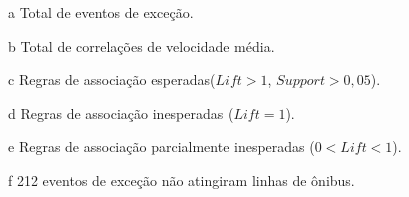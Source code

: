 \documentclass[
	12pt,				%
	oneside,			%
	a4paper,			%
	english,			%
	brazil				%
	]{abntex2ppgsi}
\begin{document}
{{{\begin{apendicesenv}
\begin{table}[!htb]
\begin{threeparttable}
\begin{tablenotes}
            \item[a] Total de eventos de exceção.
            \item[b] Total de correlações de velocidade média.
            \item[c] Regras de associação esperadas($Lift > 1$, $Support > 0,05$).
            \item[d] Regras de associação inesperadas ($Lift = 1$).
            \item[e] Regras de associação parcialmente inesperadas ($0 < Lift < 1$).
            \item[f] 212 eventos de exceção não atingiram linhas de ônibus.
        \end{tablenotes}
\end{threeparttable}
\end{table}



\end{apendicesenv}}}}
\end{document}
